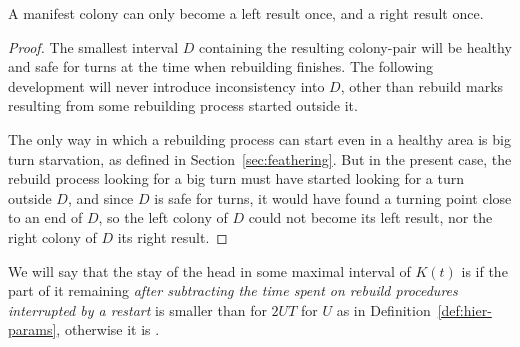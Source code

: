 \documentclass[11pt]{memoir}
\theoremstyle{definition} %
\def\U{U}
\newcommand{\Tu}{T}
\begin{document}
  \begin{lemma}\label{lem:escape.results}
  A manifest colony can only become a left result once, and a right result once.
\end{lemma}
\begin{proof}
  The smallest interval \( D \) containing the resulting colony-pair will be healthy and safe
  for turns at the time when rebuilding finishes.
  The following development will never introduce inconsistency into \( D \),
  other than rebuild marks resulting from some rebuilding process started outside it.

  The only way in which a rebuilding process can start even in a healthy area is
  big turn starvation, as defined in Section~\ref{sec:feathering}.
  But in the present case, the rebuild process looking for a big turn must have started
  looking for a turn outside \( D \), and since \( D \) is safe for turns, it would have
  found a turning point close to an end of \( D \), so the left colony of \( D \) could not become
  its left result, nor the right colony of \( D \) its right result.
\end{proof}

  We will say that the stay of the head in some maximal interval of \( K(t) \) is 
  if the part of it remaining \emph{after subtracting the time
  spent on rebuild procedures interrupted by a restart}
is smaller than for \( 2\U\Tu \) for \( \U \) as in Definition~\ref{def:hier-params},
otherwise it is .
\end{document}
